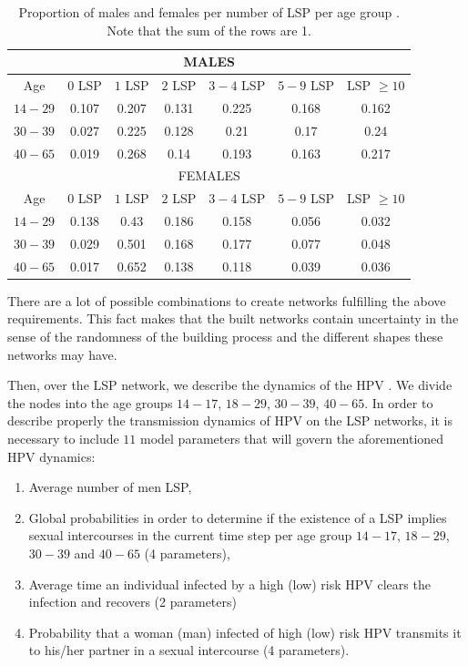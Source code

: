 \begin{table}[h]
	\centering
	\begin{tabular}{|c|c|c|c|c|c|c|}
		\multicolumn{7}{c}{MALES} \\
		\hline
		Age & $0$ LSP & $1$ LSP & $2$ LSP & $3-4$ LSP & $5-9$ LSP & LSP $\ge 10$ \\
		\hline
		$14-29$ & 0.107 & 0.207 & 0.131 & 0.225 & 0.168 & 0.162 \\
		$30-39$ & 0.027 & 0.225 & 0.128 & 0.21 & 0.17 & 0.24 \\
		$40-65$ & 0.019 & 0.268 & 0.14 & 0.193 & 0.163 & 0.217 \\
		\hline 
		\multicolumn{7}{c}{FEMALES} \\
		\hline
		Age & $0$ LSP & $1$ LSP & $2$ LSP & $3-4$ LSP & $5-9$ LSP & LSP $\ge 10$ \\
		\hline
		$14-29$ & 0.138 & 0.43 & 0.186 & 0.158 & 0.056 & 0.032 \\
		$30-39$ & 0.029 & 0.501 & 0.168 & 0.177 & 0.077 & 0.048 \\
		$40-65$ & 0.017 & 0.652 & 0.138 & 0.118 & 0.039 & 0.036 \\
		\hline
	\end{tabular} 
	\caption{Proportion of males and females per number of LSP per age group \cite{INE}. Note that the sum of the rows are 1.}
	\label{tableX} 
\end{table}

There are a lot of possible combinations to create networks fulfilling the above requirements. This fact makes that the built networks contain uncertainty in the sense of the randomness of the building process and the different shapes these networks may have. 

Then, over the LSP network, we describe the dynamics of the HPV \cite{Acedo2017,DezDomingo2017}. We divide the nodes into the age groups $14-17$, $18-29$, $30-39$, $40-65$. In order to describe properly the transmission dynamics of HPV on the LSP networks, it is necessary to include $11$ model parameters that will govern the aforementioned HPV dynamics:

\begin{enumerate}
	\item Average number of men LSP, 
	\item Global probabilities in order to determine if the existence of a LSP implies sexual intercourses in the current time step per age group $14-17$, $18-29$, $30-39$ and $40-65$ (4 parameters),
	\item Average time an individual infected by a high (low) risk HPV clears the infection and recovers (2 parameters)
	\item Probability that a woman (man) infected of high (low) risk HPV transmits it to his/her partner in a sexual intercourse (4 parameters). 
\end{enumerate}

